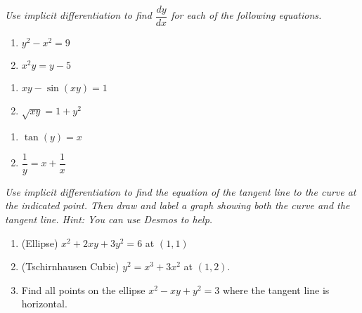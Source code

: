 \documentclass[11pt]{article}
\begin{document}
\noindent
\textit{Use implicit differentiation to find $\dfrac{dy}{dx}$ for each of the following equations.}
\noindent
\begin{multicols}{2}
\begin{enumerate}
\setcounter{enumi}{\theenumCount}
\item $y^2 - x^2 = 9$
\item $x^2 y = y - 5$
\setcounter{enumCount}{\theenumi}
\end{enumerate}
\end{multicols}
\vfill

\noindent
\begin{multicols}{2}
\begin{enumerate}
\setcounter{enumi}{\theenumCount}
\item $x y - \sin(xy) = 1$  %
\item $\sqrt{xy} = 1 + y^2$  %
\setcounter{enumCount}{\theenumi}
\end{enumerate}
\end{multicols}
\vfill

\newpage
\noindent
\begin{multicols}{2}
\begin{enumerate}
\setcounter{enumi}{\theenumCount}
\item $\tan(y) = x$
\item $\dfrac{1}{y} = x + \dfrac{1}{x}$
\setcounter{enumCount}{\theenumi}
\end{enumerate}
\end{multicols}
\vfill


\noindent
\textit{Use implicit differentiation to find the equation of the tangent line to the curve at the indicated point.  Then draw and label a graph showing both the curve and the tangent line.  Hint: You can use Desmos to help.}
\begin{enumerate}
\setcounter{enumi}{\theenumCount}
\item (Ellipse) $x^2 + 2xy + 3y^2 = 6$ at $(1,1)$    
\vfill

\item (Tschirnhausen Cubic) $y^2 = x^3 + 3x^2$ at $(1,2)$. 
\vfill

\item Find all points on the ellipse $x^2 - xy + y^2 = 3$ where the tangent line is horizontal. 
\vfill
\setcounter{enumCount}{\theenumi}
\end{enumerate}
\end{document}
